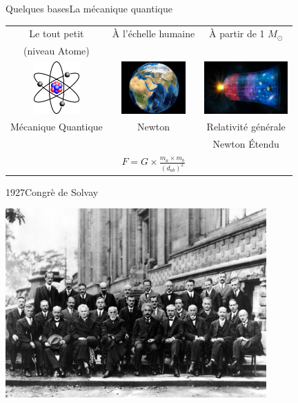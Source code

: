 \documentclass{beamer}
\begin{document}
\begin{frame}{Quelques bases}{La m\'{e}canique quantique}
  \begin{center}
    \begin{tabular}{ c c c }
      Le tout petit & \`{A} l'\'echelle humaine  & \`{A} partir de 1 \(M_\odot\) \\
      (niveau Atome) & & \\
      \includegraphics[height=2cm]{Atome_lithium_rutherford.png} & \includegraphics[height=2cm]{TerreWorldWind.jpg} & \includegraphics[height=2cm]{04-965413833409_COI.jpeg}\\
      M\'ecanique Quantique & Newton & Relativit\'e g\'en\'erale \\
      &  & Newton \'Etendu \\
      & $F = G \times \frac{m_a \times m_b}{(d_{ab})^2}$& \\
    \end{tabular}
  \end{center}
\end{frame}

\begin{frame}{1927}{Congr\`{e} de Solvay}
  \begin{center}
    \includegraphics[width=10cm]{solvay.jpeg}
  \end{center}
\end{frame}
\end{document}
